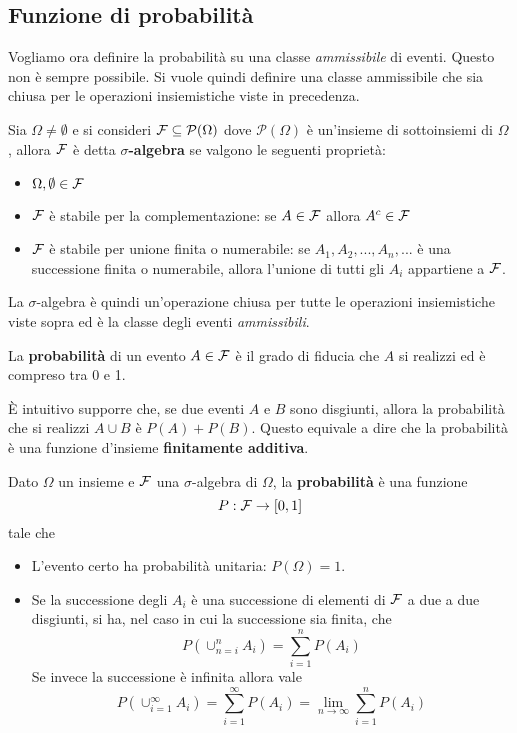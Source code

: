 \subsection{Funzione di probabilità}
Vogliamo ora definire la probabilità su una classe \emph{ammissibile} di eventi. Questo non è
sempre possibile. Si vuole quindi definire una classe ammissibile che sia chiusa per le operazioni
insiemistiche viste in precedenza.

\begin{definition}
	Sia $\Omega \neq \emptyset$ e si consideri $\mathcal{F} \subseteq \mathcal{P}(\Omega)$ dove
	$\mathcal{P}(\Omega)$ è
	un'insieme di sottoinsiemi di $\Omega$, allora $\mathcal{F}$ è detta $\sigma$\textbf{-algebra} se
	valgono le seguenti proprietà:
	\begin{itemize}
		\item $\Omega, \emptyset \in \mathcal{F}$
		\item $\mathcal{F}$ è stabile per la complementazione: se $A \in \mathcal{F}$ allora $A^c \in \mathcal{F}$
		\item $\mathcal{F}$ è stabile per unione finita o numerabile: se $A_1, A_2, ..., A_n, ...$ è una
		      successione finita o numerabile, allora l'unione di tutti gli $A_i$ appartiene a $\mathcal{F}$.
	\end{itemize}
\end{definition}

La $\sigma$-algebra è quindi un'operazione chiusa per tutte le operazioni insiemistiche viste
sopra ed è la classe degli eventi \emph{ammissibili}.

La \textbf{probabilità} di un evento $A \in \mathcal{F}$ è il grado di fiducia che $A$ si realizzi ed è
compreso tra 0 e 1.

\`E intuitivo supporre che, se due eventi $A$ e $B$ sono disgiunti, allora la probabilità che si
realizzi $A \cup B$ è $P(A) + P(B)$. Questo equivale a dire che la probabilità è una funzione
d'insieme \textbf{finitamente additiva}.

\begin{definition}
	Dato $\Omega$ un insieme e $\mathcal{F}$ una $\sigma$-algebra di $\Omega$, la \textbf{probabilità} è
	una funzione
	\[ P : \mathcal{F} \to [0, 1] \]
	tale che
	\begin{itemize}
		\item L'evento certo ha probabilità unitaria: $P(\Omega) = 1$.
		\item Se la successione degli $A_i$ è una successione di elementi di $\mathcal{F}$ a due a due
		      disgiunti, si ha, nel caso in cui la successione sia finita, che
		      \[ P (\cup_{n=i}^n A_i) = \sum_{i=1}^n P(A_i) \]
		      Se invece la successione è infinita allora vale
		      \[
			      P (\cup_{i=1}^\infty A_i) = \sum_{i=1}^\infty P(A_i) =
			      \lim_{n \to \infty} \sum_{i=1}^n P(A_i)
		      \]
	\end{itemize}
\end{definition}

